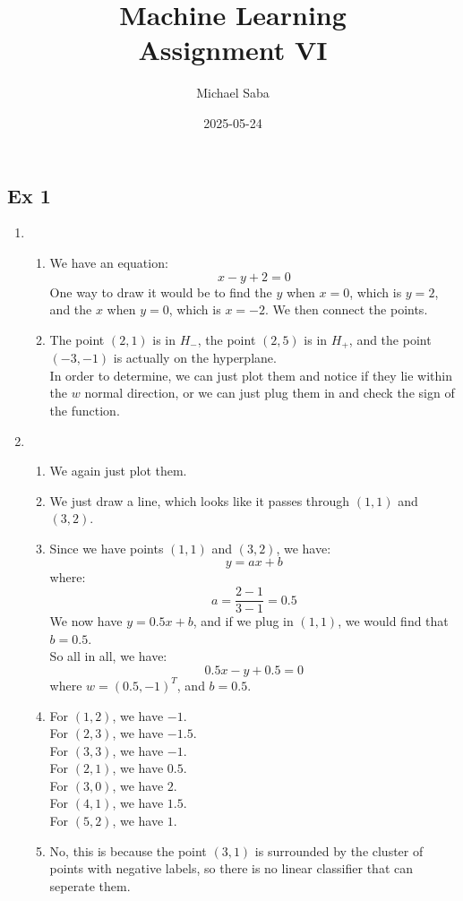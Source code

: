 \documentclass[12pt]{article}
\title{
    \Huge Machine Learning \\
    \Large Assignment VI
}
\date{2025-05-24}
\author{Michael Saba}
\begin{document}
\maketitle
\newpage
\setlength{\parindent}{0pt}

\subsection*{Ex 1}

\begin{enumerate}[label = \letters]
\item 
    \begin{enumerate}
    \item 
        We have an equation:
        \[ x - y +2 = 0 \]
        One way to draw it would be to
        find the $y$ when $x= 0$,
        which is $y = 2$,
        and the $x$ when $y = 0$,
        which is $x = -2$.
        We then connect the points.
    \item
        The point $(2, 1)$ is in $H_-$,
        the point $(2, 5)$ is in $H_+$,
        and the point $(-3, -1)$
        is actually on the hyperplane. \\
        In order to determine, we can just
        plot them and notice if they lie within
        the $w$ normal direction, or we can
        just plug them in and check the sign
        of the function.
    \end{enumerate}
\item 
     \begin{enumerate}
    \item 
        We again just plot them.
    \item
        We just draw a line,
        which looks like it passes through
        $(1, 1)$ and $(3, 2)$.
    \item 
        Since we have points $(1, 1)$ and $(3, 2)$,
        we have:
        \[ y = ax + b \]
        where:
        \[ a = \dfrac{2-1}{3-1} = 0.5 \]
        We now have $y = 0.5x + b$,
        and if we plug in $(1, 1)$,
        we would find that $b = 0.5$. \\
        So all in all, we have:
        \[ 0.5x - y + 0.5 = 0 \]
        where $w = (0.5, -1)^T$, and $b = 0.5$.
    \item 
        For $(1,2)$, we have $-1$. \\
        For $(2,3)$, we have $-1.5$. \\
        For $(3,3)$, we have $-1$. \\
        For $(2,1)$, we have $0.5$. \\
        For $(3,0)$, we have $2$. \\
        For $(4,1)$, we have $1.5$. \\
        For $(5,2)$, we have $1$.
    \item 
        No, this is because the
        point $(3, 1)$ is surrounded by the cluster
        of points with negative labels,
        so there is no linear classifier
        that can seperate them.  
    \end{enumerate}
\end{enumerate}
\end{document}
